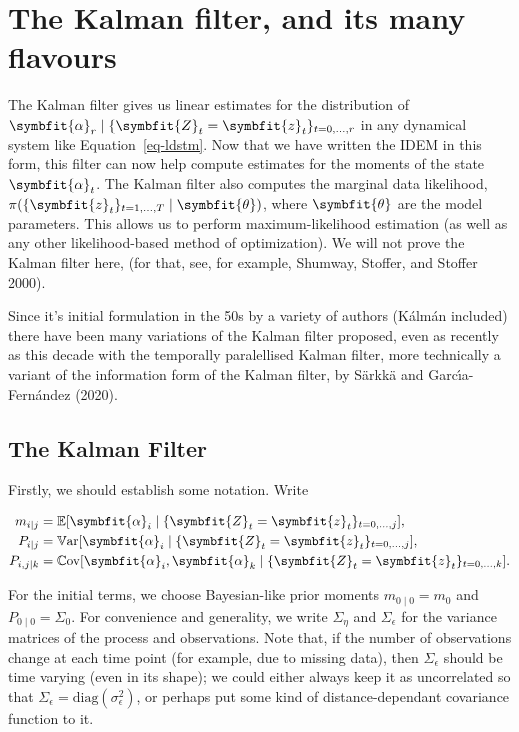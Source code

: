 \documentclass[
]{report}
\DeclareMathOperator{\var}{\mathbb{V}\mathrm{ar}}
\DeclareMathOperator{\cov}{\mathbb{C}\mathrm{ov}}
\newcommand{\bv}[1]{\symbfit{#1}}
\theoremstyle{plain}
\theoremstyle{plain}
\theoremstyle{plain}
\theoremstyle{remark}
\begin{document}
\chapter{The Kalman filter, and its many
flavours}\label{the-kalman-filter-and-its-many-flavours}

The Kalman filter gives us linear estimates for the distribution of
\(\bv\alpha_r\mid \{\bv Z_t=\bv z_t\}_{t=0,...,r}\) in any dynamical
system like Equation~\ref{eq-ldstm}. Now that we have written the IDEM
in this form, this filter can now help compute estimates for the moments
of the state \(\bv \alpha_t\). The Kalman filter also computes the
marginal data likelihood,
\(\pi(\{\bv z_t\}_{t=1,\dots, T}\mid \bv\theta)\), where \(\bv\theta\)
are the model parameters. This allows us to perform maximum-likelihood
estimation (as well as any other likelihood-based method of
optimization). We will not prove the Kalman filter here, (for that, see,
for example, Shumway, Stoffer, and Stoffer 2000).

Since it's initial formulation in the 50s by a variety of authors
(Kálmán included) there have been many variations of the Kalman filter
proposed, even as recently as this decade with the temporally
paralellised Kalman filter, more technically a variant of the
information form of the Kalman filter, by Särkkä and Garcı́a-Fernández
(2020).

\section{The Kalman Filter}\label{sec-kalmanfilter}

Firstly, we should establish some notation. Write

\[\begin{split}
m_{i \mid j} &= \mathbb E[\bv\alpha_i \mid \{\bv Z_t=\bv z_t\}_{t=0,\dots,j}],\\
P_{i \mid j} &= \var[\bv\alpha_i \mid \{\bv Z_t=\bv z_t\}_{t=0,\dots,j}],\\
P_{i,j \mid k} &= \cov[\bv\alpha_i, \bv\alpha_k \mid \{\bv Z_t=\bv z_t\}_{t=0,\dots,k}].
\end{split}
\]

For the initial terms, we choose Bayesian-like prior moments
\(m_{0\mid0}=m_0\) and \(P_{0\mid0}=\Sigma_0\). For convenience and
generality, we write \(\Sigma_\eta\) and \(\Sigma_\epsilon\) for the
variance matrices of the process and observations. Note that, if the
number of observations change at each time point (for example, due to
missing data), then \(\Sigma_\epsilon\) should be time varying (even in
its shape); we could either always keep it as uncorrelated so that
\(\Sigma_\epsilon = \mathrm{diag} (\sigma_\epsilon^2)\), or perhaps put
some kind of distance-dependant covariance function to it.
\end{document}
